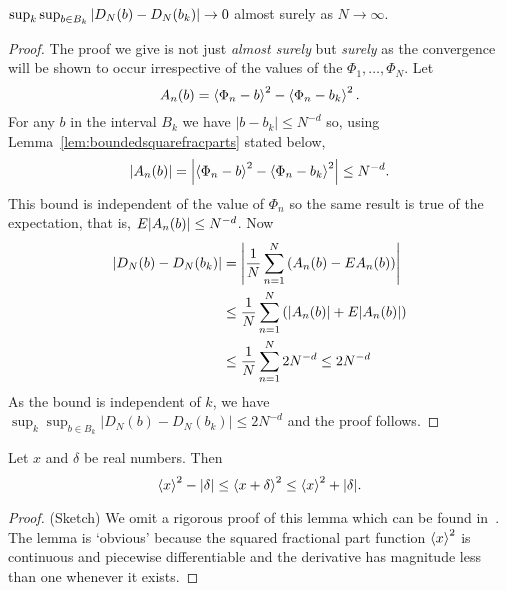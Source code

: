 \documentclass[journal]{../bib/IEEEtran}
\begin{document}
\begin{lemma}\label{lem:DNoverBij->0}
$\sup_{k }\sup_{b \in B_k}{\left| D_N(b) - D_N(b_k) \right|} \rightarrow 0$ almost surely as $N\rightarrow \infty$.
 \end{lemma}
\begin{proof}
The proof we give is not just \emph{almost surely} but \emph{surely} as the convergence will be shown to occur irrespective of the values of the $\Phi_1, \dots, \Phi_N$.  Let 
\[ 
A_n(b) = \left< \Phi_n - b \right>^2 - \left< \Phi_n - b_k \right>^2.
\]
For any $b$ in the interval $B_k$ we have $|b - b_k| \leq N^{-d}$ so, using Lemma~\ref{lem:boundedsquarefracparts} stated below,
\[
{\left| A_n(b) \right|} =  {\left| \left< \Phi_n - b \right>^2 - \left< \Phi_n - b_k \right>^2 \right|} \leq N^{-d}.
\]
This bound is independent of the value of $\Phi_n$ so the same result is true of the expectation, that is, $E{\left| A_n(b) \right|} \leq N^{-d}$.  Now
\begin{align*}
{\left| D_N(b) - D_N(b_k) \right|} &= {\left|  \frac{1}{N}\sum_{n=1}^{N} \left( A_n(b) - EA_n(b) \right)  \right|} \\
&\leq \frac{1}{N}\sum_{n=1}^{N} \left( {\left|  A_n(b)  \right|} + E{\left| A_n(b) \right|} \right)  \\ 
&\leq \frac{1}{N}\sum_{n=1}^{N} 2N^{-d} \leq 2N^{-d}
\end{align*}
As the bound is independent of $k$, we have $\sup_{k}\sup_{ b  \in B_k }\left\vert D_N(b) - D_N(b_k)\right\vert \leq 2N^{-d}$ and the proof follows.
\end{proof}

\begin{lemma}\label{lem:boundedsquarefracparts}
Let $x$ and $\delta$ be real numbers.  Then
\[
\left< x \right>^2 - |\delta| \leq \left< x + \delta \right>^2 \leq \left< x \right>^2 + |\delta|.
\]
\end{lemma}
\begin{proof} (Sketch)
We omit a rigorous proof of this lemma which can be found in~\cite[Lemma~8.4]{McKilliam2010thesis}. The lemma is `obvious' because the squared fractional part function $\left< x \right>^2$ is continuous and piecewise differentiable and the derivative has magnitude less than one whenever it exists.
\end{proof}
\end{document}
